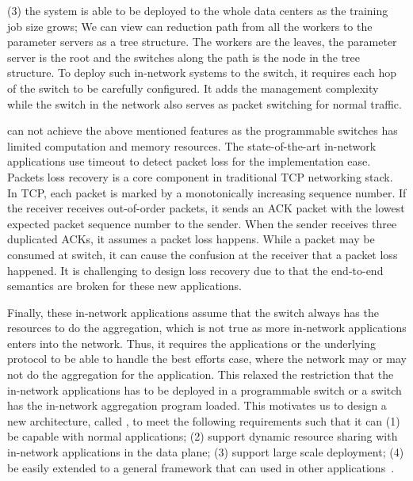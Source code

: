 (3) the system is able to be deployed to the whole data centers as
the training job size grows;
We can view can reduction path from all the workers to the parameter servers as a tree structure.
The workers are the leaves, the parameter server is the root and the switches along the path 
is the node in the tree structure.
To deploy such in-network systems to the switch, it requires each hop of the switch 
to be carefully configured.
It adds the management complexity while the switch 
in the network also serves as packet switching for normal traffic.


\switchml can not achieve the above mentioned features as the programmable
switches has limited computation and memory resources.
The state-of-the-art in-network applications use timeout to detect packet loss for the implementation ease. Packets loss recovery is a core component in
traditional TCP networking stack.
In TCP, each packet is marked by a monotonically increasing sequence number. 
If the receiver receives out-of-order packets, it sends an ACK packet with the lowest 
expected packet sequence number to the sender. 
When the sender receives three duplicated ACKs, it assumes a packet loss happens.
While a packet may be consumed at switch, it can cause the confusion at the receiver
that a packet loss happened. It is challenging to design loss recovery due to that the end-to-end semantics are broken 
for these new applications.
 
Finally, these in-network applications assume that the switch always has the resources to do the aggregation,
which is not true as more in-network applications enters into the network. Thus, it requires the applications or
the underlying protocol to be able to handle the best efforts case, where the network may or may not do the 
aggregation for the application. This relaxed the restriction that the in-network applications has to be deployed 
in a programmable switch or a switch has the in-network aggregation program loaded.   
\fi 
This motivates us to design a new architecture, called \system, to meet the following requirements such that it can (1) be capable with normal applications; (2) support dynamic resource sharing with in-network applications in the data plane;
(3) support large scale deployment; (4) be easily extended to a general framework that can used in other applications~. 

